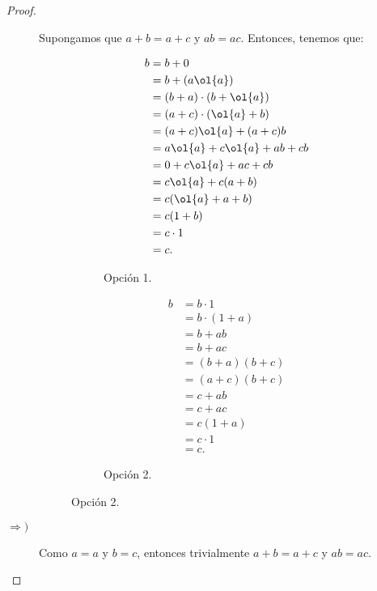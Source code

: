 \documentclass[12pt]{article}
\begin{document}
\begin{ejercicio}
\begin{proof}
\begin{description}
            Supongamos que $a+b=a+c$ y $ab=ac$. Entonces, tenemos que:
            \begin{figure}[H]
                \centering
                \begin{subfigure}[c]{0.4\linewidth}
                    \centering
                    \begin{align*}
                        b &= b + 0\\
                        &= b + (a\ol{a})\\
                        &= (b+a) \cdot (b+\ol{a})\\
                        &= (a+c) \cdot (\ol{a}+b)\\
                        &= (a+c)\ol{a} + (a+c)b\\
                        &= a\ol{a} + c\ol{a} + ab + cb\\
                        &= 0 + c\ol{a} + ac + cb\\
                        &= c\ol{a} + c(a+b)\\
                        &= c(\ol{a} + a + b)\\
                        &= c(1+b)\\
                        &= c\cdot 1\\
                        &= c.
                    \end{align*}
                    \caption{Opción 1.}
                \end{subfigure}\hfill
                \begin{subfigure}[c]{0.4\linewidth}
                    \centering
                    \begin{align*}
                        b &= b\cdot 1\\
                        &= b\cdot (1+a) \\
                        &= b+ab\\
                        &= b+ac\\
                        &= (b+a)(b+c)\\
                        &= (a+c)(b+c)\\
                        &= c+ab\\
                        &= c+ac\\
                        &= c(1+a)\\
                        &= c\cdot 1\\
                        &= c.
                    \end{align*}
                    \caption{Opción 2.}
                \end{subfigure}
            \end{figure}

            \item[$\Longrightarrow)$]
            
            Como $a=a$ y $b=c$, entonces trivialmente $a+b=a+c$ y $ab=ac$.
        \end{description}
    \end{proof}
\end{ejercicio}
\end{document}
